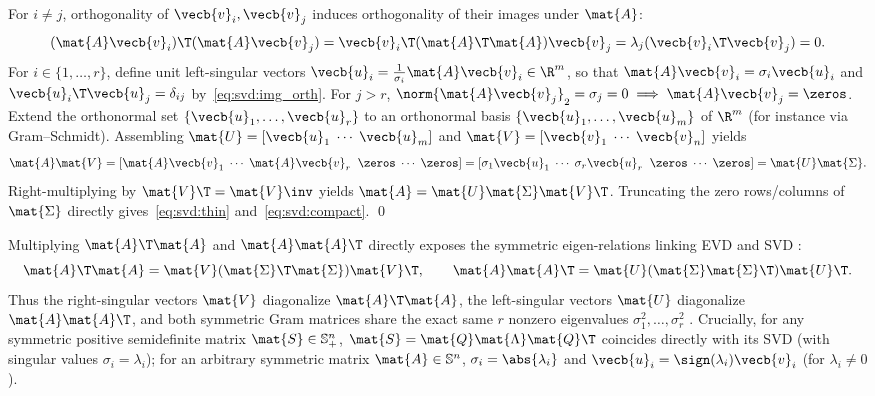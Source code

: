 \documentclass[../../../../master.tex]{subfiles}
\begin{document}
\begin{coremath}
For $i \neq j$, orthogonality of $\vecb{v}_i, \vecb{v}_j$ induces orthogonality of their images under $\mat{A}$:
\begin{equation}
\label{eq:svd:img_orth}
  (\mat{A}\vecb{v}_i)\T (\mat{A}\vecb{v}_j) = \vecb{v}_i\T (\mat{A}\T\mat{A}) \vecb{v}_j = \lambda_j (\vecb{v}_i\T \vecb{v}_j) = 0.
\end{equation}
For $i \in \{1,\dots,r\}$, define unit left-singular vectors $\vecb{u}_i = \frac{1}{\sigma_i}\mat{A}\vecb{v}_i \in \R^m$, so that $\mat{A}\vecb{v}_i = \sigma_i\vecb{u}_i$ and $\vecb{u}_i\T \vecb{u}_j = \delta_{ij}$ by~\eqref{eq:svd:img_orth}. For $j > r$, $\norm{\mat{A}\vecb{v}_j}_2 = \sigma_j = 0 \implies \mat{A}\vecb{v}_j = \zeros$. Extend the orthonormal set $\{\vecb{u}_1,\dots,\vecb{u}_r\}$ to an orthonormal basis $\{\vecb{u}_1,\dots,\vecb{u}_m\}$ of $\R^m$ (for instance via Gram--Schmidt). Assembling $\mat{U} = [\vecb{u}_1 \;\cdots\; \vecb{u}_m]$ and $\mat{V} = [\vecb{v}_1 \;\cdots\; \vecb{v}_n]$ yields
\[
  \mat{A}\mat{V} = [\mat{A}\vecb{v}_1 \;\cdots\; \mat{A}\vecb{v}_r \;\; \zeros \;\cdots\; \zeros] = [\sigma_1\vecb{u}_1 \;\cdots\; \sigma_r\vecb{u}_r \;\; \zeros \;\cdots\; \zeros] = \mat{U}\mat{\Sigma}.
\]
Right-multiplying by $\mat{V}\T = \mat{V}\inv$ yields $\mat{A} = \mat{U}\mat{\Sigma}\mat{V}\T$. Truncating the zero rows/columns of $\mat{\Sigma}$ directly gives~\eqref{eq:svd:thin} and~\eqref{eq:svd:compact}. \qed
\end{coremath}

Multiplying $\mat{A}\T\mat{A}$ and $\mat{A}\mat{A}\T$ directly exposes the symmetric eigen-relations linking EVD and SVD :
\begin{equation}
\label{eq:svd:gram_evd}
  \mat{A}\T\mat{A} = \mat{V}(\mat{\Sigma}\T\mat{\Sigma})\mat{V}\T, \qquad \mat{A}\mat{A}\T = \mat{U}(\mat{\Sigma}\mat{\Sigma}\T)\mat{U}\T.
\end{equation}
Thus the right-singular vectors $\mat{V}$ diagonalize $\mat{A}\T\mat{A}$, the left-singular vectors $\mat{U}$ diagonalize $\mat{A}\mat{A}\T$, and both symmetric Gram matrices share the exact same $r$ nonzero eigenvalues $\sigma_1^2, \dots, \sigma_r^2$ . Crucially, for any symmetric positive semidefinite matrix $\mat{S} \in \mathbb{S}_+^n$, $\mat{S} = \mat{Q}\mat{\Lambda}\mat{Q}\T$ coincides directly with its SVD (with singular values $\sigma_i = \lambda_i$); for an arbitrary symmetric matrix $\mat{A} \in \mathbb{S}^n$, $\sigma_i = \abs{\lambda_i}$ and $\vecb{u}_i = \sign(\lambda_i)\vecb{v}_i$ (for $\lambda_i \neq 0$).
\end{document}
